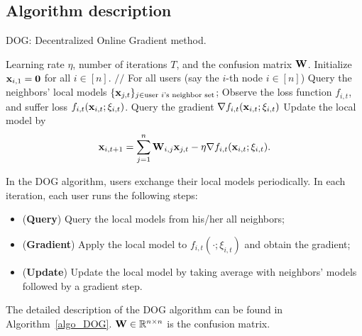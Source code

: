 \documentclass{article}
\begin{document}
\subsection{Algorithm description}


\begin{algorithm}[!]
   \caption{\textsc{DOG}: Decentralized Online Gradient method.}
   \label{algo_DOG}
   \begin{algorithmic}[1]
   \REQUIRE Learning rate $\eta$, number of iterations $T$, and the confusion matrix ${\bf W}$.    
  \STATE Initialize ${\bf x}_{i,1} = {\bf 0}$ for all $i\in [n]$.    
            \STATE $\slash\slash$ For all users (say the $i$-th node $i\in[n]$)
                        \STATE \indent Query the neighbors' local models $\{{\bf x}_{j,t}\}_{j\in \text{user $i$'s neighbor set}}$;
            \STATE \indent Observe the loss function $f_{i,t}$, and suffer loss $f_{i,t}({\bf x}_{i,t};\xi_{i,t})$.
            \STATE \indent Query the gradient $\nabla f_{i,t}({\bf x}_{i,t};\xi_{i,t})$
            \STATE \indent Update the local model by 
            \[{\bf x}_{i,t+1} = \sum_{j=1}^n {\bf W}_{i,j}{\bf x}_{j,t} - \eta \nabla f_{i,t}({\bf x}_{i,t};\xi_{i,t}).\] 
       \ENDFOR
   \end{algorithmic}
\end{algorithm}

In the DOG algorithm, users exchange their local models periodically. In each iteration, each user runs the following steps:
\begin{itemize}
\item ({\bf Query}) Query the local models from his/her all neighbors;
\item ({\bf Gradient}) Apply the local model to $f_{i,t}(\cdot; \xi_{i,t})$ and obtain the gradient;
\item ({\bf Update}) Update the local model by taking average with neighbors' models followed by a gradient step.
\end{itemize}
The detailed description of the DOG algorithm can be found in Algorithm~\ref{algo_DOG}. ${\bf W}\in\mathbb{R}^{n\times n}$ is the confusion matrix. 



\end{document}
